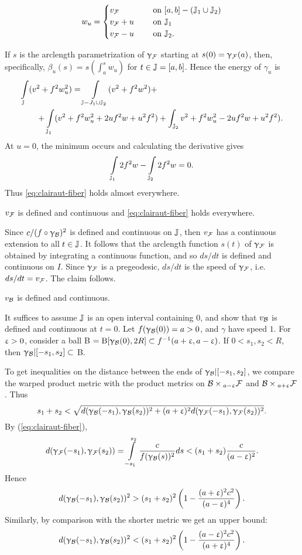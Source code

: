 {$$w_u =
\begin{cases}
v_\spc{F} \quad &\text{\ on\ } [a,b]- (\JJ_1\cup \JJ_2)\\
v_\spc{F}+u \quad &\text{\ on\ } \JJ_1\\
v_\spc{F}-u \quad &\text{\ on\ } \JJ_2.
\end{cases}
$$

If $s$ is the arclength parametrization of $\upgamma_{\mathcal{F}}$ starting at
$s(0) = \upgamma_{\mathcal{F}}(a)$, then, specifically, $\beta_u(s) = s(\int_a^s
w_u)$ for $t \in\JJ= [a,b]$. Hence the energy of $\gamma_u$ is
\begin{align*}
\int\limits_\JJ(v&^2+f^2w_u^2) 
= \int\limits_{\JJ -J_1\cup \JJ_2} (v^2+f^2w^2) +\\
&+\int\limits_{\JJ_1}(v^2+f^2w_u^2 + 2uf^2w + u^2f^2) +\int_{\JJ_2}v^2+f^2w_u^2 - 2uf^2w
+ u^2f^2).
\end{align*}
At $u=0$,  the minimum occurs and calculating the
derivative gives
$$\int\limits_{\mathbb{J}_1} 2f^2w - \int\limits_{\mathbb{J}_2} 2f^2w = 0.$$ 
Thus \ref{eq:clairaut-fiber} holds almost everywhere.  

\begin{clm}{}\label{clm:clairaut} $v_{\mathcal{F}}$ is defined and continuous and \ref{eq:clairaut-fiber} holds everywhere.
\end{clm}
Since $c/(f\circ \gamma_\spc{B})^{2}$ is defined and continuous on $\mathbb{J}$, then $v_ {\mathcal{F}}$ has a continuous extension to all $t\in \JJ$. It follows that the arclength function  $s(t)$ of   $\upgamma_{\mathcal{F}}$ is obtained by integrating a continuous function, and so $ds/dt$ is defined and continuous on $I$.  Since $\upgamma_{\mathcal{F}}$ is a pregeodesic, $ds/dt$ is the speed of $\upgamma_{\mathcal{F}}$, i.e. $ds/dt=v_{\mathcal{F}}$.  The claim follows.

\begin{clm}{}\label{clm:v_B} $v_{\mathcal{B}}$ is defined and continuous.
\end{clm}


It suffices to assume $\mathbb{J}$ is an open interval containing $0$, and show that $v_{\mathcal{B}}$ is defined and continuous at $t=0$. Let  $f(\upgamma_{\mathcal{B}}(0))=a>0$, and $\gamma$ have speed $1$.  For 
 $\upvarepsilon>0$, consider a ball B $=\oBall[\gamma_\spc{B}(0),2R]\subset f^{-1}(a+\eps,a-\eps)$.  If $0<s_1,s_2< R$, then $\gamma_\spc{B}|[-s_1,s_2]\subset$ B.
 

To get inequalities on the distance between the ends of $\upgamma_{\mathcal{B}}|[-s_1,s_2]$,
we compare the warped product metric with the  product metrics on
$\spc{B}\times_{a-\eps}\spc{F}$ and $\spc{B}\times_{a+\eps}\spc{F}$.  Thus 
$$s_1+s_2 < \sqrt{d(\upgamma_{\mathcal{B}}(-s_1),\upgamma_{\mathcal{B}}(s_2))^2
+ (a+\upvarepsilon)^2d(\upgamma_{\mathcal{F}}(-s_1),\upgamma_{\mathcal{F}}(s_2))^2}.$$
By (\ref{eq:clairaut-fiber}),
$$d(\upgamma_{\mathcal{F}}(-s_1),\upgamma_{\mathcal{F}}(s_2)) = 
\int\limits_{-s_1}^{s_2}\frac{c}{f(\upgamma_{\mathcal{B}}(s))^2}ds
< (s_1+s_2)\frac{c}{(a-\upvarepsilon)^2}.$$
Hence
$$d(\upgamma_{\mathcal{B}}(-s_1), \upgamma_{\mathcal{B}}(s_2))^2 >
(s_1+s_2)^2\left(1 -\frac{(a+\upvarepsilon)^2c^2}{(a-\upvarepsilon)^4}\right).$$
Similarly, by comparison with the shorter metric we get an upper bound:
$$d(\upgamma_{\mathcal{B}}(-s_1), \upgamma_{\mathcal{B}}(s_2))^2 <
(s_1+s_2)^2\left(1 -\frac{(a-\upvarepsilon)^2c^2}{(a+\upvarepsilon)^4}\right).$$

}
